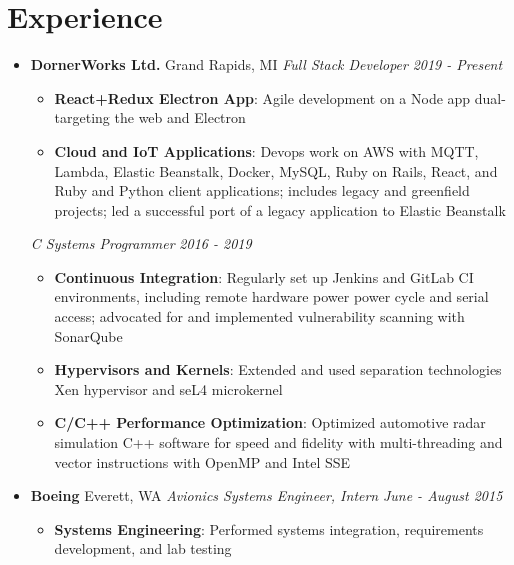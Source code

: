 \documentclass[letterpaper,11pt]{article}
\newcommand{\resumeItem}[2]{
  \item\small{
    \textbf{#1}{: #2 \vspace{-2pt}}
  }
}
\newcommand{\resumeSubheading}[4]{
  \vspace{-1pt}\item
    \textbf{#1} \dotfill #2 \newline
    \textit{\small#3} \hfill \textit{\small #4}
  \vspace{-5pt}
}
\newcommand{\resumeSubheadingII}[2]{
  \vspace{-1pt}
    \textit{\small#1} \hfill \textit{\small #2}
  \vspace{-5pt}
}
\newcommand{\resumeSubHeadingListStart}{\begin{itemize}[leftmargin=*]}
\newcommand{\resumeSubHeadingListEnd}{\end{itemize}}
\newcommand{\resumeItemListStart}{\begin{itemize}}
\newcommand{\resumeItemListEnd}{\end{itemize}\vspace{-5pt}}
\begin{document}
\section{Experience}
  \resumeSubHeadingListStart

    \resumeSubheading
      {DornerWorks Ltd.}{Grand Rapids, MI}
      {Full Stack Developer}{2019 - Present}
      \resumeItemListStart
        \resumeItem{React+Redux Electron App}
          {Agile development on a Node app dual-targeting the web and Electron}
        \resumeItem{Cloud and IoT Applications}
          {Devops work on AWS with MQTT, Lambda, Elastic Beanstalk, Docker, MySQL, Ruby on Rails, React, and Ruby and Python client applications;
            includes legacy and greenfield projects; led a successful port of a legacy application to Elastic Beanstalk}
      \resumeItemListEnd
      \resumeSubheadingII{C Systems Programmer}{2016 - 2019}
      \resumeItemListStart
        \resumeItem{Continuous Integration}
          {Regularly set up Jenkins and GitLab CI environments, including remote hardware power power cycle and serial access;
            advocated for and implemented vulnerability scanning with SonarQube}
        \resumeItem{Hypervisors and Kernels}
          {Extended and used separation technologies Xen hypervisor and seL4 microkernel}
        \resumeItem{C/C++ Performance Optimization}
          {Optimized automotive radar simulation C++ software for speed and fidelity with multi-threading and vector instructions with OpenMP and Intel SSE}
      \resumeItemListEnd

    \resumeSubheading
      {Boeing}{Everett, WA}
      {Avionics Systems Engineer, Intern}{June - August 2015}
      \resumeItemListStart
        \resumeItem{Systems Engineering}
          {Performed systems integration, requirements development, and lab testing}
      \resumeItemListEnd

  \resumeSubHeadingListEnd


\end{document}
